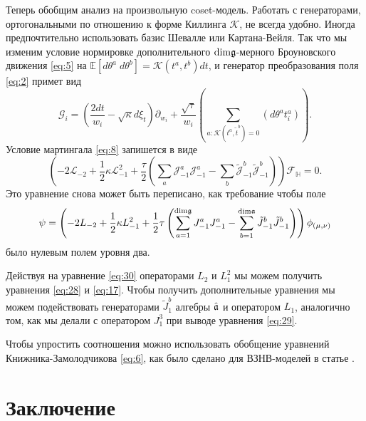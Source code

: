 Теперь обобщим анализ на произвольную  coset-модель. Работать с генераторами, ортогональными по отношению к форме Киллинга $\mathcal{K}$, не всегда удобно. Иногда предпочтительно использовать базис Шевалле или Картана-Вейля. Так что мы изменим условие нормировке дополнительного $\mathrm{dim}\mathfrak{g}$-мерного Броуновского движения \eqref{eq:5} на $\mathbb{E}\left[d\theta^{a}\; d\theta^{b}\right]=\mathcal{K}(t^{a},t^{b})dt$, и генератор преобразования поля  \eqref{eq:2} примет вид 
\begin{equation*}
  \mathcal{G}_{i}=\left(\frac{2dt}{w_{i}}-\sqrt{\kappa} d\xi_{t}\right) \partial_{w_{i}}+\frac{\sqrt{\tau}}{w_{i}}\left(\sum_{a:\mathcal{K}(t^{a},\tilde{t}^{b})=0}\left(d \theta ^{a} t^{a}_{i}\right)\right).
\end{equation*}
Условие мартингала  \eqref{eq:8} запишется в виде
\begin{equation*}
  \left(-2 \mathcal{L}_{-2}+\frac{1}{2}\kappa \mathcal{L}_{-1}^{2}+\frac{\tau}{2}\left( \sum_{a} \mathcal{J}^{a}_{-1} \mathcal{J}^{a}_{-1}-
      \sum_{b}\tilde{\mathcal{J}}^{b}_{-1} \tilde{\mathcal{J}}^{b}_{-1}\right)\right)        \mathcal{F}_{\mathbb{H}}=0.
\end{equation*}
Это уравнение снова может быть переписано, как требование чтобы поле
\begin{equation}
  \psi=\left(-2L_{-2}+\frac{1}{2}\kappa L_{-1}^{2}+\frac{1}{2}\tau \left(\sum_{a=1}^{\mathrm{dim}\mathfrak{g}}J^{a}_{-1}J^{a}_{-1}-\sum_{b=1}^{\mathrm{dim}\mathfrak{a}}\tilde{J}^{b}_{-1}\tilde{J}^{b}_{-1}\right)\right) \phi_{(\mu,\nu)}
\label{eq:30}
\end{equation}
было нулевым полем уровня два.

Действуя на уравнение \eqref{eq:30} операторами  $L_{2}$ и $L_{1}^{2}$ мы можем получить уравнения \eqref{eq:28} и \eqref{eq:17}. Чтобы получить дополнительные уравнения мы можем подействовать генераторами  $\tilde{J}^{b}_{1}$ алгебры $\hat{\mathfrak{a}}$ и оператором $L_{1}$, аналогично том, как мы делали с оператором  $J^{3}_{1}$ при выводе уравнения \eqref{eq:29}. 

Чтобы упростить соотношения можно использовать обобщение уравнений Книжника-Замолодчикова \eqref{eq:6}, как было сделано для ВЗНВ-моделей в статье \cite{alekseev2010sle}. 

\section{Заключение}
\label{sec:conclusion}

